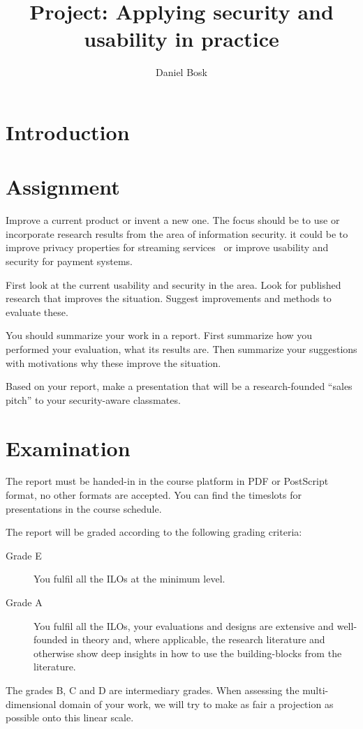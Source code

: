 \title{Project: Applying security and usability in practice}
\author{Daniel Bosk}

\maketitle

\mode*

%  

\section{Introduction}%
\label{sec:intro}




\section{Assignment}%
\label{sec:work}

Improve a current product or invent a new one.
The focus should be to use or incorporate research results from the area of 
information security.
\Eg it could be to improve privacy properties for streaming 
services~\cite[\eg][]{anonpass} or
improve usability and security for payment systems.

First look at the current usability and security in the area.
Look for published research that improves the situation.
Suggest improvements and methods to evaluate these.

You should summarize your work in a report.
First summarize how you performed your evaluation, what its results are.
Then summarize your suggestions with motivations why these improve the 
situation.

Based on your report, make a presentation that will be a research-founded 
\enquote{sales pitch} to your security-aware classmates.


\section{Examination}%
\label{sec:exam}

The report must be handed-in in the course platform in PDF or PostScript 
format, no other formats are accepted.
You can find the timeslots for presentations in the course schedule.

The report will be graded according to the following grading criteria:
\begin{description}
  \item[Grade E] You fulfil all the \acp{ILO} at the minimum level.
  \item[Grade A] You fulfil all the \acp{ILO},
    your evaluations and designs are extensive and well-founded in theory and, 
    where applicable, the research literature and otherwise show deep insights 
    in how to use the building-blocks from the literature.
\end{description}
The grades B, C and D are intermediary grades.
When assessing the multi-dimensional domain of your work, we will try to make 
as fair a projection as possible onto this linear scale.


\printbibliography
